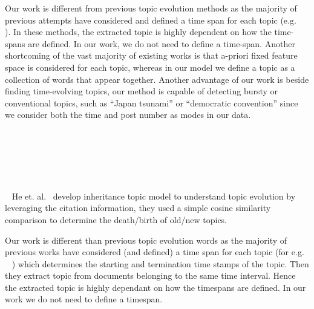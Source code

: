Our work is different from previous topic evolution methods as the majority of previous attempts have considered and defined
a time span for each topic (e.g. ~\cite{Mei:2005:DET} ). %
In these methods, the extracted topic is highly dependent on how the time-spans are defined. In our work, we do not
need to define a time-span. 
Another shortcoming of the vast majority of existing works is that a-priori fixed feature space is considered for each topic, whereas in
our model we define a topic as a collection of words that appear together. Another advantage of our work is beside
finding time-evolving topics, our method is capable of detecting bursty or conventional topics, such as ``Japan tsunami''
or ``democratic convention'' since we consider both the time and post number as modes in our data.




\iffalse
~\cite{jo2011web}

~\cite{saha2012learning}

~\cite{falkowski2006mining}


~\cite{wang2006topics,he2009detecting,kandylas2008finding}
He et. al.~\cite{he2009detecting} develop inheritance topic model to understand topic evolution by leveraging the citation
information, they used a simple cosine similarity comparison to determine the death/birth of old/new topics. 


Our work is different than previous topic evolution words as the majority of previous works have considered (and defined) a time span for each topic (for e.g. ~\cite{Mei:2005:DET} ) which determines the starting and termination time stamps of the topic. Then they extract topic from documents belonging to the same time interval. Hence the extracted topic is highly dependant on how the timespans are defined.  In our work we do not need to define a timespan. 

